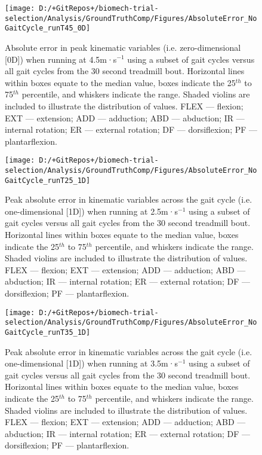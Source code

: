 \documentclass[]{elsarticle} %
\begin{document}
\begin{figure}

{\centering \texttt{[image: D:/+GitRepos+/biomech-trial-selection/Analysis/GroundTruthComp/Figures/AbsoluteError\_NoGaitCycle\_runT45\_0D]} 

}

\caption{Absolute error in peak kinematic variables (i.e. zero-dimensional [0D]) when running at 4.5m·s$^{-1}$ using a subset of gait cycles versus all gait cycles from the 30 second treadmill bout. Horizontal lines within boxes equate to the median value, boxes indicate the 25$^{th}$ to 75$^{th}$ percentile, and whiskers indicate the range. Shaded violins are included to illustrate the distribution of values. FLEX — flexion; EXT — extension; ADD — adduction; ABD — abduction; IR — internal rotation; ER — external rotation; DF — dorsiflexion; PF — plantarflexion.}\label{fig:groundTruthError_runT45_0D}
\end{figure}

\begin{figure}

{\centering \texttt{[image: D:/+GitRepos+/biomech-trial-selection/Analysis/GroundTruthComp/Figures/AbsoluteError\_NoGaitCycle\_runT25\_1D]} 

}

\caption{Peak absolute error in kinematic variables across the gait cycle (i.e. one-dimensional [1D]) when running at 2.5m·s$^{-1}$ using a subset of gait cycles versus all gait cycles from the 30 second treadmill bout. Horizontal lines within boxes equate to the median value, boxes indicate the 25$^{th}$ to 75$^{th}$ percentile, and whiskers indicate the range. Shaded violins are included to illustrate the distribution of values. FLEX — flexion; EXT — extension; ADD — adduction; ABD — abduction; IR — internal rotation; ER — external rotation; DF — dorsiflexion; PF — plantarflexion.}\label{fig:groundTruthError_runT25_1D}
\end{figure}

\begin{figure}

{\centering \texttt{[image: D:/+GitRepos+/biomech-trial-selection/Analysis/GroundTruthComp/Figures/AbsoluteError\_NoGaitCycle\_runT35\_1D]} 

}

\caption{Peak absolute error in kinematic variables across the gait cycle (i.e. one-dimensional [1D]) when running at 3.5m·s$^{-1}$ using a subset of gait cycles versus all gait cycles from the 30 second treadmill bout. Horizontal lines within boxes equate to the median value, boxes indicate the 25$^{th}$ to 75$^{th}$ percentile, and whiskers indicate the range. Shaded violins are included to illustrate the distribution of values. FLEX — flexion; EXT — extension; ADD — adduction; ABD — abduction; IR — internal rotation; ER — external rotation; DF — dorsiflexion; PF — plantarflexion.}\label{fig:groundTruthError_runT35_1D}
\end{figure}
\end{document}
